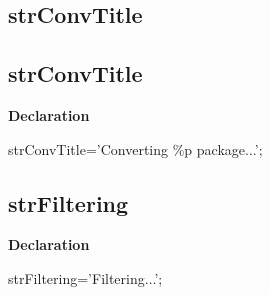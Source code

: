 \documentclass{report}
\newif\ifpdf
\begin{document}
\subsection*{\large{\textbf{strConvTitle}}\normalsize\hspace{1ex}\hrulefill}
\else
\subsection*{strConvTitle}
\fi
\label{trstrings-strConvTitle}
\begin{list}{}{
\setlength{\itemindent}{0cm}
\setlength{\listparindent}{0cm}
\setlength{\leftmargin}{\evensidemargin}
\addtolength{\leftmargin}{\tmplength}
\settowidth{\labelsep}{X}
\addtolength{\leftmargin}{\labelsep}
\setlength{\labelwidth}{\tmplength}
}
\item[\textbf{Declaration}\hfill]
\ifpdf
\begin{flushleft}
\fi
\begin{ttfamily}
strConvTitle='Converting {\%}p package...';\end{ttfamily}

\ifpdf
\end{flushleft}
\fi

\end{list}
\ifpdf
\subsection*{\large{\textbf{strFiltering}}\normalsize\hspace{1ex}\hrulefill}
\else
\subsection*{strFiltering}
\fi
\label{trstrings-strFiltering}
\begin{list}{}{
\setlength{\itemindent}{0cm}
\setlength{\listparindent}{0cm}
\setlength{\leftmargin}{\evensidemargin}
\addtolength{\leftmargin}{\tmplength}
\settowidth{\labelsep}{X}
\addtolength{\leftmargin}{\labelsep}
\setlength{\labelwidth}{\tmplength}
}
\item[\textbf{Declaration}\hfill]
\ifpdf
\begin{flushleft}
\fi
\begin{ttfamily}
strFiltering='Filtering...';\end{ttfamily}

\ifpdf
\end{flushleft}
\fi

\end{list}
\ifpdf
\end{document}
